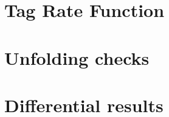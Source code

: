 \chapter{Tag Rate Function}
\label{app:trf}



\chapter{Unfolding checks}
\label{app:unfolding}



\chapter{Differential results}
\label{app:results}
